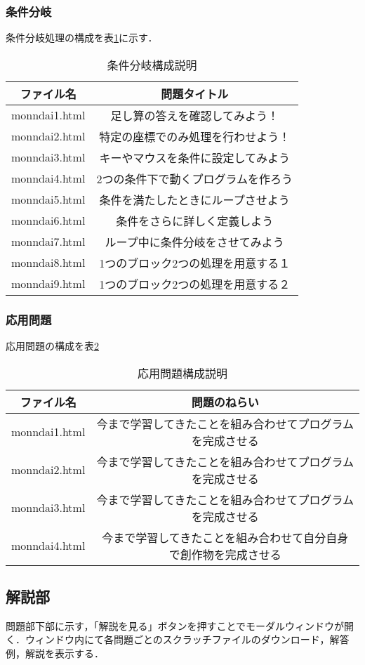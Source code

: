 \subsubsection{条件分岐}
条件分岐処理の構成を表\ref{tab:zyoukenhyou}に示す．

\begin{table}[htb]
\begin{center}
    \caption{条件分岐構成説明}
  \begin{tabular}{|c|c|} \hline
     ファイル名  & 問題タイトル  \\ \hline
     monndai1.html& 足し算の答えを確認してみよう！ \\ \hline
     monndai2.html& 特定の座標でのみ処理を行わせよう！ \\ \hline
     monndai3.html& キーやマウスを条件に設定してみよう \\ \hline
     monndai4.html& 2つの条件下で動くプログラムを作ろう \\ \hline
     monndai5.html& 条件を満たしたときにループさせよう \\ \hline
     monndai6.html& 条件をさらに詳しく定義しよう \\ \hline
     monndai7.html& ループ中に条件分岐をさせてみよう \\ \hline
     monndai8.html& 1つのブロック2つの処理を用意する１ \\ \hline
     monndai9.html& 1つのブロック2つの処理を用意する２\\ \hline
  \end{tabular}
  \label{tab:zyoukenhyou}
  \end{center}
\end{table}

\subsubsection{応用問題}
応用問題の構成を表\ref{tab:ouyouhyou}
\begin{table}[htb]
\begin{center}
    \caption{応用問題構成説明}
  \begin{tabular}{|c|c|} \hline
     ファイル名  & 問題のねらい  \\ \hline
     monndai1.html& 今まで学習してきたことを組み合わせてプログラムを完成させる \\ \hline
     monndai2.html& 今まで学習してきたことを組み合わせてプログラムを完成させる \\ \hline
     monndai3.html& 今まで学習してきたことを組み合わせてプログラムを完成させる \\ \hline
     monndai4.html& 今まで学習してきたことを組み合わせて自分自身で創作物を完成させる \\ \hline
  \end{tabular}
  \label{tab:ouyouhyou}
  \end{center}
\end{table}


\subsection{解説部}
問題部下部に示す，「解説を見る」ボタンを押すことでモーダルウィンドウが開く．ウィンドウ内にて各問題ごとのスクラッチファイルのダウンロード，解答例，解説を表示する．












